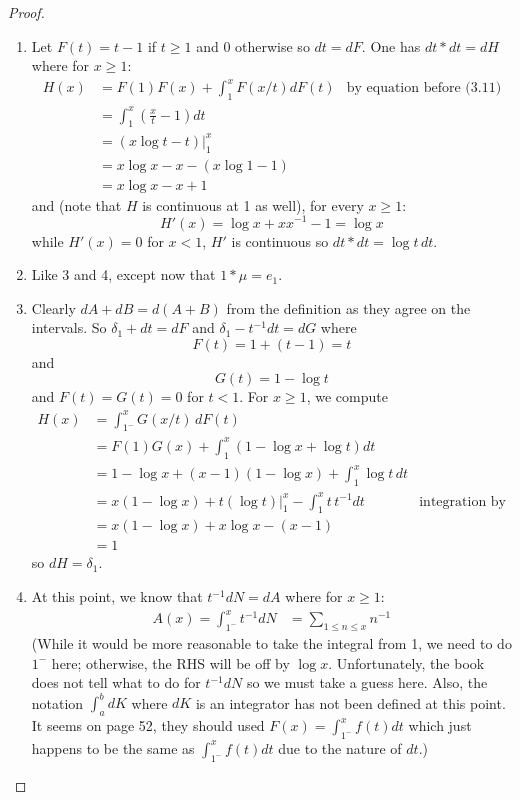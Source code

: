 \documentclass{article}
\begin{document}
\begin{proof}
\begin{enumerate}
\item Let $F(t) = t - 1$ if $t \geq 1$ and 0 otherwise so $dt = dF$. One has $dt * dt = dH$ where for $x \geq 1$: 
\begin{align*}
H(x) &= F(1) F(x) + \int_1^x F(x/t) dF(t) &\text{by equation before (3.11)}\\
&= \int_1^x \left( \frac xt - 1 \right) dt\\
&= \left. (x \log t - t) \right|_1^x\\
&= x \log x - x - (x \log 1 - 1)\\
&= x \log x - x + 1
\end{align*}
and (note that $H$ is continuous at 1 as well), for every $x \geq 1$:
$$H'(x) = \log x + x x^{-1} - 1 = \log x$$
while $H'(x) = 0$ for $x < 1$, $H'$ is continuous so $dt * dt = \log t \, dt$.

\item Like 3 and 4, except now that $1 * \mu = e_1$.

\item Clearly $dA + dB = d(A + B)$ from the definition as they agree on the intervals. So $\delta_1 + dt = dF$ and $\delta_1 - t^{-1} dt = dG$ where
$$F(t) = 1 + (t - 1) = t$$
and
$$G(t) = 1 - \log t$$
and $F(t) = G(t) = 0$ for $t < 1$. For $x \geq 1$, we compute
\begin{align*}
H(x) &= \int_{1^-}^x G(x/t) \, dF(t)\\
&= F(1) G(x) + \int_1^x (1 - \log x + \log t) dt\\
&= 1 - \log x + (x - 1) (1 - \log x) + \int_1^x \log t \, dt\\
&= x (1 - \log x) + t (\log t)|_1^x - \int_1^x t \, t^{-1} dt &\text{integration by parts}\\
&= x (1 - \log x) + x \log x - (x - 1)\\
&= 1
\end{align*}
so $dH = \delta_1$.

\item At this point, we know that $t^{-1} dN = dA$ where for $x \geq 1$:
\begin{align*}
A(x) = \int_{1^-}^x t^{-1} dN
&= \sum_{1 \leq n \leq x} n^{-1}
\end{align*}
(While it would be more reasonable to take the integral from 1, we need to do $1^-$ here; otherwise, the RHS will be off by $\log x$. Unfortunately, the book does not tell what to do for $t^{-1} dN$ so we must take a guess here. Also, the notation $\int_a^b dK$ where $dK$ is an integrator has not been defined at this point. It seems on page 52, they should used $F(x) = \int_{1^-}^x f(t) dt$ which just happens to be the same as $\int_{1^-}^x f(t) dt$ due to the nature of $dt$.)


\end{enumerate}
\end{proof}
\end{document}
